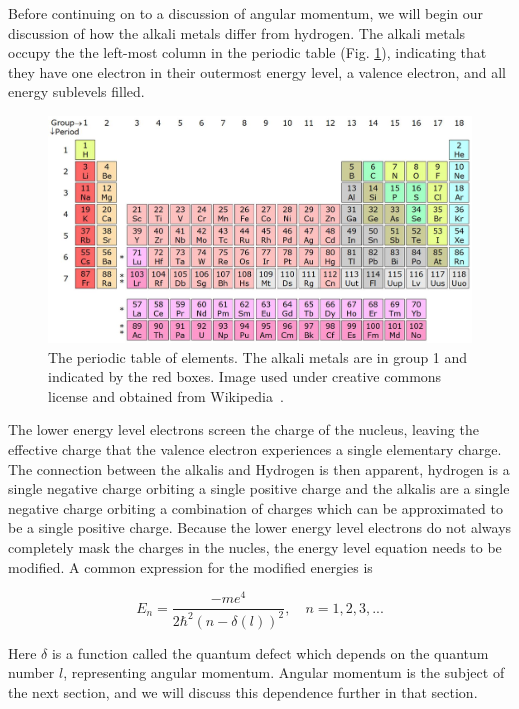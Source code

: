 \documentclass[letter,12pt]{article}
\begin{document}
		Before continuing on to a discussion of angular momentum, 
		we will begin our discussion of how the alkali metals differ
		from hydrogen. The alkali metals occupy the the left-most
		column in the periodic table (Fig. \ref{periodicTable}), 
		indicating that they have one
		electron in their outermost energy level, a valence electron,
		and all energy sublevels filled. 
		\begin{figure}[h]
			\centering
			\includegraphics[width=\textwidth]{periodicTable}
			\caption{\label{periodicTable}The periodic table 
				of elements. The alkali metals 
			are in group 1 and indicated by the red boxes. Image
			used under creative commons license and obtained
			from Wikipedia~\cite{periodicWiki}.}
		\end{figure}
		The lower energy level
		electrons screen the charge of the nucleus, leaving the effective
		charge that the valence electron experiences 
        a single elementary charge. The connection between the alkalis
		and Hydrogen is then apparent, hydrogen is a single negative charge
		orbiting a single positive charge and the alkalis are a single
		negative charge orbiting a combination of charges which 
		can be approximated to be a single positive charge.
        Because the lower energy level electrons do not always completely
		mask the charges in the nucles, the energy level equation 
		needs to be modified. A common
        expression for the modified energies is

		\begin{equation}\label{modEnergy}
            E_n=\frac{-me^4}{2\hbar^2(n-\delta(l))^2},\quad n=1,2,3,...
		\end{equation}

        Here $\delta$ is a function called the quantum defect which
        depends on the quantum number $l$, representing angular momentum.
        Angular momentum is the subject of the next section, and we 
        will discuss this dependence further in that section.
\end{document}
